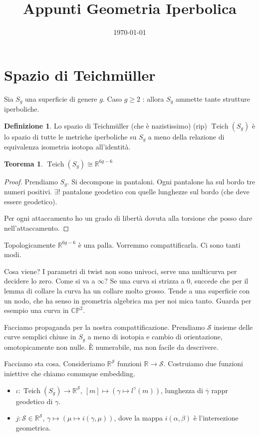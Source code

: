 \documentclass[a4paper]{article}
\title{Appunti Geometria Iperbolica}
\date{\today}
\newtheorem{theorem}{Teorema}
\theoremstyle{definition}
\newtheorem{definition}{Definizione}
\DeclareMathOperator{\Teich}{Teich}
\begin{document}
    \maketitle
    
\section{Spazio di Teichmüller}

    Sia $S_g$ una superficie di genere $g$. Caso $g \geq 2$ : allora $S_g$ ammette tante strutture iperboliche.

    \begin{definition}
        Lo spazio di Teichmüller (che è nazistissimo) (rip) $\Teich(S_g)$ è lo spazio di tutte le metriche iperboliche su $S_g$ a meno della relazione di equivalenza isometria isotopa all'identità.
    \end{definition}

    \begin{theorem}
        $\Teich(S_g) \cong \mathbb R^{6g-6}$
    \end{theorem}

    \begin{proof}
        Prendiamo $S_g$. Si decompone in pantaloni. Ogni pantalone ha sul bordo tre numeri positivi. $\exists!$ pantalone geodetico con quelle lunghezze sul bordo (che deve essere geodetico).

        Per ogni attaccamento ho un grado di libertà dovuta alla torsione che posso dare nell'attaccamento.
    \end{proof}
    
    Topologicamente $\mathbb R^{6g-6}$ è una palla. Vorremmo compattificarla. Ci sono tanti modi.

    Cosa viene? I parametri di twist non sono univoci, serve una multicurva per decidere lo zero. Come si va a $\infty$? Se una curva si strizza a $0$, succede che per il lemma di collare la curva ha un collare molto grosso. Tende a una superficie con un nodo, che ha senso in geometria algebrica ma per noi mica tanto. Guarda per esempio una curva in $\mathbb {CP}^2$.

    Facciamo propaganda per la nostra compattificazione. Prendiamo $\mathcal S$ insieme delle curve semplici chiuse in $S_g$ a meno di isotopia e cambio di orientazione, omotopicamente non nulle. È numerabile, ma non facile da descrivere.

    Facciamo sta cosa. Consideriamo $\mathbb R^\mathcal S$ funzioni $\mathbb R \to \mathcal S$. Costruiamo due funzioni iniettive che chiamo comunque embedding.
    \begin{itemize}
        \item $\iota: \Teich(S_g) \to \mathbb R^\mathcal{S}$, $[m] \mapsto \left(\gamma \mapsto l^\gamma(m)\right)$, lunghezza di $\overline{\gamma}$ rappr geodetico di $\gamma$.
        \item $j: \mathcal S \in \mathbb R^{\mathcal S}$, $\gamma \mapsto (\mu \mapsto i(\gamma,\mu))$, dove la mappa $i(\alpha,\beta)$ è l'intersezione geometrica.
    \end{itemize}
\end{document}
